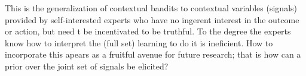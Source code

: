 This is the generalization of contextual bandits to contextual variables (signals) provided by self-interested experts who have no ingerent interest in the outcome or action, but need t be incentivated to be truthful. 
To the degree the experts know how to interpret the (full set) learning to do it is ineficient. 
How to incorporate this apears as a fruitful avenue for future research; that is how can a prior over the joint set of signals be elicited? 











	




